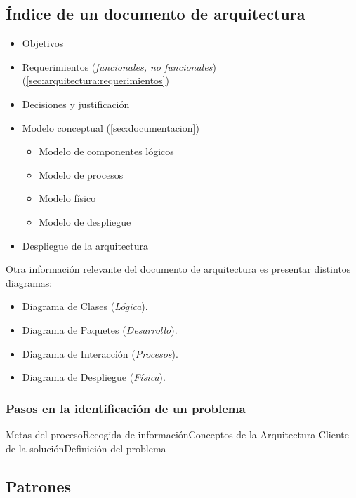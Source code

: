 \subsection{Índice de un documento de arquitectura}
\label{sec:indicearquitectura}
\begin{itemize}[noitemsep]
\item Objetivos
\item Requerimientos (\emph{funcionales, no funcionales})
  (\ref{sec:arquitectura:requerimientos})
\item Decisiones y justificación
\item Modelo conceptual (\ref{sec:documentacion})
  \begin{itemize}[noitemsep]
  \item Modelo de componentes lógicos
  \item Modelo de procesos
  \item Modelo físico
  \item Modelo de despliegue
  \end{itemize}
\item Despliegue de la arquitectura
\end{itemize}

Otra información relevante del documento de arquitectura es presentar
distintos diagramas:
\begin{itemize}[noitemsep]
\item Diagrama de Clases (\emph{Lógica}).
\item Diagrama de Paquetes (\emph{Desarrollo}).
\item Diagrama de Interacción (\emph{Procesos}).
\item Diagrama de Despliegue (\emph{Física}).
\end{itemize}

\subsubsection{Pasos en la identificación de un problema}
Metas del proceso\textrightarrow Recogida de
información\textrightarrow Conceptos de la Arquitectura\textrightarrow
Cliente de la solución\textrightarrow Definición del problema

\subsection{Patrones}
\label{sec:patrones}


